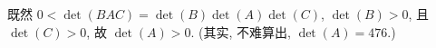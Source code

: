 \documentclass[../libro.tex]{subfiles}
\begin{document}
\begin{example}[continues=emp:NonzeroDet2]
    既然 \(0 < \det {(BAC)} = \det {(B)} \det {(A)} \det {(C)}\),
    \(\det {(B)} > 0\), 且 \(\det {(C)} > 0\),
    故 \(\det {(A)} > 0\).
    (其实, 不难算出, \(\det {(A)} = 476.\))
\end{example}

\endgroup
\end{document}
